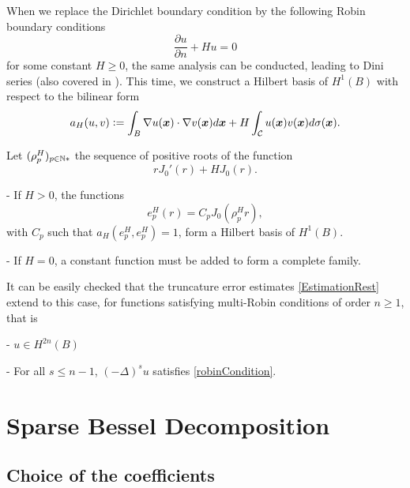 \documentclass[11pt,a4paper]{article}
\begin{document}
When we replace the Dirichlet boundary condition by the following Robin boundary conditions
\begin{equation}
	\label{robinCondition}
	\dfrac{\partial u}{\partial n} + H u = 0
\end{equation}
for some constant $H \geq 0$, the same analysis can be conducted, leading to Dini series (also covered in \cite{watson1995treatise}). This time, we construct a Hilbert basis of $H^1(B)$ with respect to the bilinear form
\[a_H(u,v) \mathrel{\mathop:}= \int_{B} \nabla u(\boldsymbol{x} ) \cdot \nabla v(\boldsymbol{x} ) d\boldsymbol{x} + H \int_{\mathcal{C}}{u(\boldsymbol{x} )v(\boldsymbol{x} )}d\sigma(\boldsymbol{x} ).\]
\begin{The}
	Let $(\rho_p^H)_{p \in \mathbb{N}*}$ the sequence of positive roots of the function
	\[r J_0'(r) + H J_0(r).\]
	\item[-] If $H>0$, the functions 
	\[e_p^H(r) = C_p J_0(\rho_p^H r),\]
	with $C_p$ such that $a_H(e_p^H,e_p^H) = 1$, form a Hilbert basis of $H^1(B)$. 
	\item[-]If $H = 0$, a constant function must be added to form a complete family. 
\end{The}
It can be easily checked that the truncature error estimates \autoref{EstimationRest} extend to this case, for functions satisfying multi-Robin conditions of order $n \geq 1$, that is 
\item[-] $u \in H^{2n}(B)$
\item[-] For all $s\leq n-1$, $(-\Delta)^s u$ satisfies \eqref{robinCondition}.


\section{Sparse Bessel Decomposition}
\label{sec:SBD}
\subsection{Choice of the coefficients}
\end{document}
